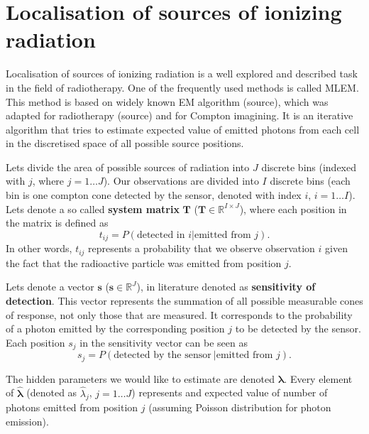 \section{Localisation of sources of ionizing radiation}

Localisation of sources of ionizing radiation is a well explored and described task in the field of radiotherapy.
One of the frequently used methods is called \ac{MLEM}.
This method is based on widely known EM algorithm (source), which was adapted for radiotherapy (source) and for Compton imagining.
It is an iterative algorithm that tries to estimate expected value of emitted photons from each cell in the discretised space of all possible source positions.




Lets divide the area of possible sources of radiation into $J$ discrete bins (indexed with $j$, where $j = 1 \dotsc J$).
Our observations are divided into $I$ discrete bins (each bin is one compton cone detected by the sensor, denoted with index $i$, $i = 1 \dotsc I$).
Lets denote a so called \textbf{system matrix} $\mathbf{T}$ ($\mathbf{T} \in \mathbb{R}^{I \times J}$), where each position in the matrix is defined as
\begin{equation}
  t_{ij} =  P(\textrm{detected in } i | \textrm{emitted from } j).
\end{equation}
In other words, $t_{ij}$ represents a probability that we observe observation $i$ given the fact that the radioactive particle was emitted from position $j$.

Lets denote a vector $\mathbf{s}$ ($\mathbf{s} \in \mathbb{R}^{J}$), in literature denoted as \textbf{sensitivity of detection}.
This vector represents the summation of all possible measurable cones of response, not only those that are measured.
It corresponds to the probability of a photon emitted by the corresponding position $j$ to be detected by the sensor.
Each position $s_{j}$ in the sensitivity vector can be seen as 
\begin{equation}
  s_{j} =  P(\textrm{detected by the sensor}\ | \textrm{emitted from } j).
\end{equation}

The hidden parameters we would like to estimate are denoted $\bm{\hat{\lambda}}$.
Every element of $\bm{\hat{\lambda}}$ (denoted as $\hat{\lambda}_{j}$, $j = 1 \dotsc J$) represents and expected value of number of photons emitted from position $j$ (assuming Poisson distribution for photon emission).

